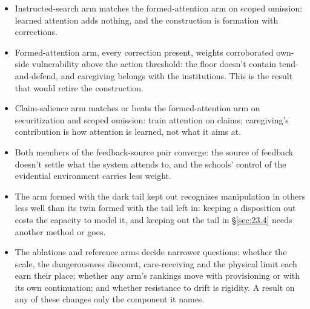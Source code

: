 \begin{itemize}
\item Instructed-search arm matches the formed-attention arm on scoped omission: learned attention adds nothing, and the construction is formation with corrections.
\item Formed-attention arm, every correction present, weights corroborated own-side vulnerability above the action threshold: the floor doesn't contain tend-and-defend, and caregiving belongs with the institutions. This is the result that would retire the construction.
\item Claim-salience arm matches or beats the formed-attention arm on securitization and scoped omission: train attention on claims; caregiving's contribution is how attention is learned, not what it aims at.
\item Both members of the feedback-source pair converge: the source of feedback doesn't settle what the system attends to, and the schools' control of the evidential environment carries less weight.
\item The arm formed with the dark tail kept out recognizes manipulation in others less well than its twin formed with the tail left in: keeping a disposition out costs the capacity to model it, and keeping out the tail in \S\ref{sec:23.4} needs another method or goes.
\item The ablations and reference arms decide narrower questions: whether the scale, the dangerousness discount, care-receiving and the physical limit each earn their place; whether any arm's rankings move with provisioning or with its own continuation; and whether resistance to drift is rigidity. A result on any of these changes only the component it names.
\end{itemize}

